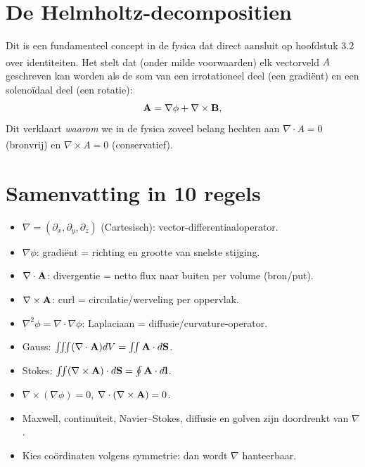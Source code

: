 \documentclass[11pt,a4paper]{article}
\begin{document}
    \section{De Helmholtz-decompositien}
    Dit is een fundamenteel concept in de fysica dat direct aansluit op hoofdstuk 3.2 over identiteiten\textsuperscript{}.
    Het stelt dat (onder milde voorwaarden) elk vectorveld $A$ geschreven kan worden als de som van een irrotationeel deel (een gradiënt) en een solenoïdaal deel (een rotatie):
    \[
        \vb{A} = \nabla\phi + \nabla\times\vb{B},
    \]
    Dit verklaart \textit{waarom} we in de fysica zoveel belang hechten aan
    $\nabla \cdot A = 0$ (bronvrij) en
    $\nabla \times A = 0$
    (conservatief)\textsuperscript{}\textsuperscript{}\textsuperscript{}\textsuperscript{}.



    \section{Samenvatting in 10 regels}
    \begin{tcolorbox}[colback=green!6,colframe=green!35,title=Cheat sheet]
        \begin{itemize}
            \item \(\nabla = (\partial_x,\partial_y,\partial_z)\) (Cartesisch): vector-differentiaaloperator.
            \item \(\nabla\phi\): gradi\"ent = richting en grootte van snelste stijging.
            \item \(\nabla\cdot\vb{A}\): divergentie = netto flux naar buiten per volume (bron/put).
            \item \(\nabla\times\vb{A}\): curl = circulatie/werveling per oppervlak.
            \item \(\nabla^2\phi = \nabla\cdot\nabla\phi\): Laplaciaan = diffusie/curvature-operator.
            \item Gauss: \(\iiint (\nabla\cdot\vb{A})dV = \iint \vb{A}\cdot d\vb{S}\).
            \item Stokes: \(\iint (\nabla\times\vb{A})\cdot d\vb{S} = \oint \vb{A}\cdot d\vb{l}\).
            \item \(\nabla\times(\nabla\phi)=0\), \(\nabla\cdot(\nabla\times\vb{A})=0\).
            \item Maxwell, continu\"iteit, Navier--Stokes, diffusie en golven zijn doordrenkt van \(\nabla\).
            \item Kies co\"ordinaten volgens symmetrie: dan wordt \(\nabla\) hanteerbaar.
        \end{itemize}
    \end{tcolorbox}
\end{document}
